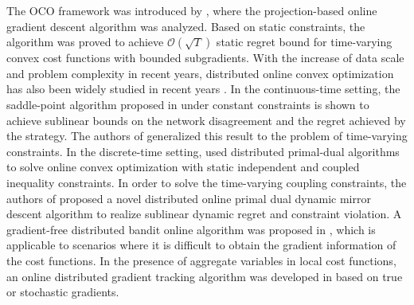 \documentclass[letterpaper, 10 pt, conference]{ieeeconf}  %
\begin{document}
The OCO framework was introduced by \cite{zink2003}, where the projection-based online gradient descent algorithm was analyzed. Based on static constraints, the algorithm was proved to achieve $\mathcal{O}(\sqrt{T})$ static regret bound for time-varying convex cost functions with bounded subgradients. 
With the increase of data scale and problem complexity in recent years, distributed online convex optimization has also been widely studied in recent years \cite{zhou2018}. In the continuous-time setting, the saddle-point algorithm proposed in \cite{lee2016} under constant constraints is shown to achieve sublinear bounds on the network disagreement and the regret achieved by the strategy. The authors of \cite{pater2020} generalized this result to the problem of time-varying constraints.
In the discrete-time setting, \cite{yuan2018, lxx2021} used distributed primal-dual algorithms to solve online convex optimization with static independent and coupled inequality constraints. In order to solve the time-varying coupling constraints, the authors of \cite{yi2020} proposed a novel distributed online primal dual dynamic mirror descent algorithm to realize sublinear dynamic regret and constraint violation. 
A gradient-free distributed bandit online algorithm was proposed in \cite{yi20212}, which is applicable to scenarios where it is difficult to obtain the gradient information of the cost functions.
In the presence of aggregate variables in local cost functions, an online distributed gradient tracking algorithm was developed in \cite{li20212} based on true or stochastic gradients.
\end{document}
